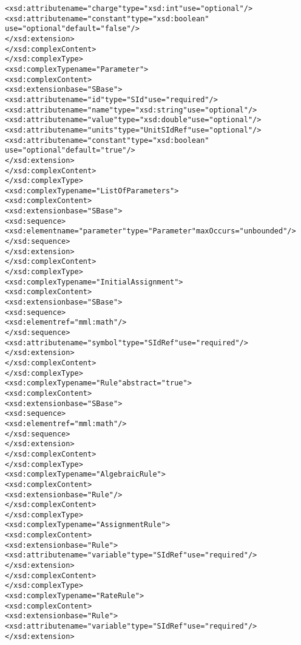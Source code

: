 \begin{alltt}
                <xsd:attribute name="charge" type="xsd:int" use="optional"/>
                <xsd:attribute name="constant" type="xsd:boolean" 
                               use="optional" default="false"/>
            </xsd:extension>
        </xsd:complexContent>
    </xsd:complexType>
    <xsd:complexType name="Parameter">
        <xsd:complexContent>
            <xsd:extension base="SBase">
                <xsd:attribute name="id" type="SId" use="required"/>
                <xsd:attribute name="name" type="xsd:string" use="optional"/>
                <xsd:attribute name="value" type="xsd:double" use="optional"/>
                <xsd:attribute name="units" type="UnitSIdRef" use="optional"/>
                <xsd:attribute name="constant" type="xsd:boolean" 
                               use="optional" default="true"/>
            </xsd:extension>
        </xsd:complexContent>
    </xsd:complexType>
    <xsd:complexType name="ListOfParameters">
        <xsd:complexContent>
            <xsd:extension base="SBase">
                <xsd:sequence>
                    <xsd:element name="parameter" type="Parameter" maxOccurs="unbounded"/>
                </xsd:sequence>
            </xsd:extension>
        </xsd:complexContent>
    </xsd:complexType>
    <xsd:complexType name="InitialAssignment">
        <xsd:complexContent>
            <xsd:extension base="SBase">
                <xsd:sequence>
                    <xsd:element ref="mml:math"/>
                </xsd:sequence>
                <xsd:attribute name="symbol" type="SIdRef" use="required"/>
            </xsd:extension>
        </xsd:complexContent>
    </xsd:complexType>
    <xsd:complexType name="Rule" abstract="true">
        <xsd:complexContent>
            <xsd:extension base="SBase">
                <xsd:sequence>
                    <xsd:element ref="mml:math"/>
                </xsd:sequence>
            </xsd:extension>
        </xsd:complexContent>
    </xsd:complexType>
    <xsd:complexType name="AlgebraicRule">
        <xsd:complexContent>
            <xsd:extension base="Rule"/>
        </xsd:complexContent>
    </xsd:complexType>
    <xsd:complexType name="AssignmentRule">
        <xsd:complexContent>
            <xsd:extension base="Rule">
                <xsd:attribute name="variable" type="SIdRef" use="required"/>
            </xsd:extension>
        </xsd:complexContent>
    </xsd:complexType>
    <xsd:complexType name="RateRule">
        <xsd:complexContent>
            <xsd:extension base="Rule">
                <xsd:attribute name="variable" type="SIdRef" use="required"/>
            </xsd:extension>

\end{alltt}
